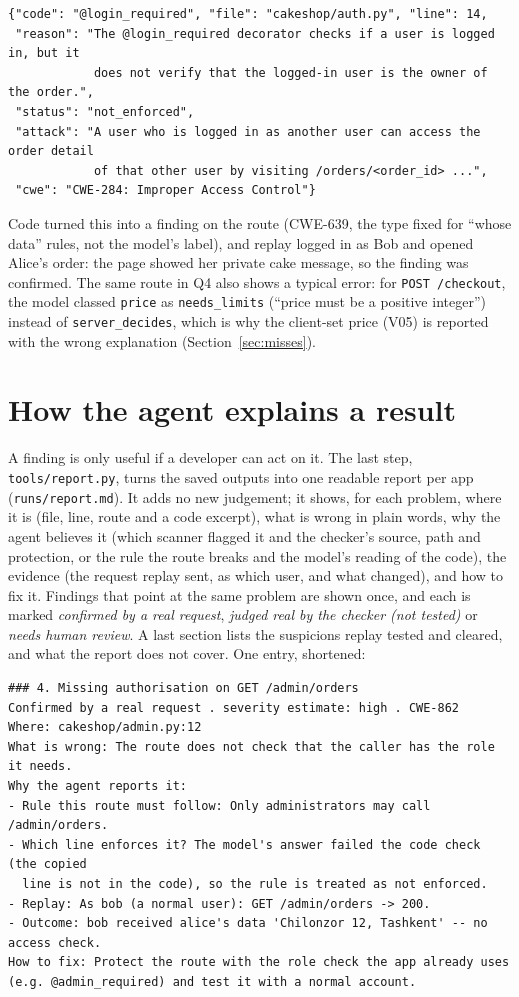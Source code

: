 \documentclass[11pt,a4paper]{article}
\newcommand{\code}[1]{\texttt{#1}}
\begin{document}
\begin{lstlisting}
{"code": "@login_required", "file": "cakeshop/auth.py", "line": 14,
 "reason": "The @login_required decorator checks if a user is logged in, but it
            does not verify that the logged-in user is the owner of the order.",
 "status": "not_enforced",
 "attack": "A user who is logged in as another user can access the order detail
            of that other user by visiting /orders/<order_id> ...",
 "cwe": "CWE-284: Improper Access Control"}
\end{lstlisting}

Code turned this into a finding on the route (CWE-639, the type fixed for ``whose data'' rules, not the model's
label), and replay logged in as Bob and opened Alice's order: the page showed her private cake message, so the
finding was confirmed. The same route in Q4 also shows a typical error: for \code{POST /checkout}, the model
classed \code{price} as \code{needs\_limits} (``price must be a positive integer'') instead of
\code{server\_decides}, which is why the client-set price (V05) is reported with the wrong explanation
(Section~\ref{sec:misses}).

\section{How the agent explains a result}
\label{sec:explain}

A finding is only useful if a developer can act on it. The last step, \code{tools/report.py}, turns the saved
outputs into one readable report per app (\code{runs/report.md}). It adds no new judgement; it shows, for each
problem, where it is (file, line, route and a code excerpt), what is wrong in plain words, why the agent believes it
(which scanner flagged it and the checker's source, path and protection, or the rule the route breaks and the model's
reading of the code), the evidence (the request replay sent, as which user, and what changed), and how to fix it.
Findings that point at the same problem are shown once, and each is marked \emph{confirmed by a real request},
\emph{judged real by the checker (not tested)} or \emph{needs human review}. A last section lists the suspicions replay tested
and cleared, and what the report does not cover. One entry, shortened:

\begin{lstlisting}
### 4. Missing authorisation on GET /admin/orders
Confirmed by a real request . severity estimate: high . CWE-862
Where: cakeshop/admin.py:12
What is wrong: The route does not check that the caller has the role it needs.
Why the agent reports it:
- Rule this route must follow: Only administrators may call /admin/orders.
- Which line enforces it? The model's answer failed the code check (the copied
  line is not in the code), so the rule is treated as not enforced.
- Replay: As bob (a normal user): GET /admin/orders -> 200.
- Outcome: bob received alice's data 'Chilonzor 12, Tashkent' -- no access check.
How to fix: Protect the route with the role check the app already uses
(e.g. @admin_required) and test it with a normal account.
\end{lstlisting}
\end{document}
